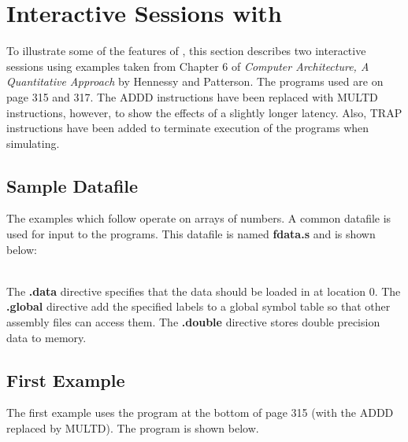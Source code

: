 \section{Interactive Sessions with \dlxsim}

To illustrate some of the features of \dlxsim, this section describes
two interactive sessions using examples taken from Chapter 6
of {\it Computer Architecture, A Quantitative Approach} by Hennessy and
Patterson.  The programs used are on page 315 and 317.  The ADDD
instructions have been replaced with MULTD instructions, however, to
show the effects of a slightly longer latency.  Also, TRAP instructions
have been added to terminate execution of the programs when simulating.

\subsection{Sample Datafile}

The examples which follow operate on arrays of numbers.  A common datafile
is used for input to the programs.  This datafile is named {\bf fdata.s}
and is shown below:\\

\begin{assembly}
\end{assembly} \\

The {\bf .data} directive specifies that the data should be loaded in
at location 0.  The {\bf .global} directive add the specified labels
to a global symbol table so that other assembly files can access them.
The {\bf .double} directive stores double precision data to memory.

\subsection{First Example}

The first example uses the program at the bottom of page 315 (with the
ADDD replaced by MULTD).  The program is shown below. \\

\begin{assembly}
\end{assembly} \\

